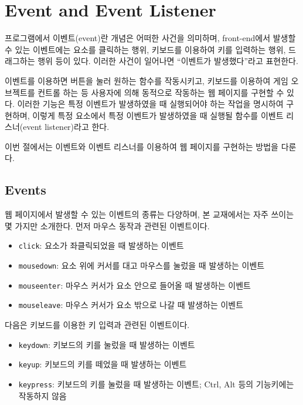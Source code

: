 \section{Event and Event Listener}\label{sect:event-and-event-listener}

프로그램에서 이벤트(event)란 개념은 어떠한 사건을 의미하며, front-end에서 발생할 수 있는 이벤트에는 요소를 클릭하는 행위, 키보드를 이용하여 키를 입력하는 행위, 드래그하는 행위 등이 있다. 이러한 사건이 일어나면 ``이벤트가 발생했다''라고 표현한다.

이벤트를 이용하면 버튼을 눌러 원하는 함수를 작동시키고, 키보드를 이용하여 게임 오브젝트를 컨트롤 하는 등 사용자에 의해 동적으로 작동하는 웹 페이지를 구현할 수 있다. 이러한 기능은 특정 이벤트가 발생하였을 때 실행되어야 하는 작업을 명시하여 구현하며, 이렇게 특정 요소에서 특정 이벤트가 발생하였을 때 실행될 함수를 이벤트 리스너(event listener)라고 한다. 

이번 절에서는 이벤트와 이벤트 리스너를 이용하여 웹 페이지를 구현하는 방법을 다룬다.

\subsection*{Events}

웹 페이지에서 발생할 수 있는 이벤트의 종류는 다양하며, 본 교재에서는 자주 쓰이는 몇 가지만 소개한다. 먼저 마우스 동작과 관련된 이벤트이다.

\begin{itemize}
    \item \texttt{click}: 요소가 좌클릭되었을 때 발생하는 이벤트
    \item \texttt{mousedown}: 요소 위에 커서를 대고 마우스를 눌렀을 때 발생하는 이벤트
    \item \texttt{mouseenter}: 마우스 커서가 요소 안으로 들어올 때 발생하는 이벤트
    \item \texttt{mouseleave}: 마우스 커서가 요소 밖으로 나갈 때 발생하는 이벤트
\end{itemize}

다음은 키보드를 이용한 키 입력과 관련된 이벤트이다.

\begin{itemize}
    \item \texttt{keydown}: 키보드의 키를 눌렀을 때 발생하는 이벤트
    \item \texttt{keyup}: 키보드의 키를 떼었을 때 발생하는 이벤트
    \item \texttt{keypress}: 키보드의 키를 눌렀을 때 발생하는 이벤트; Ctrl, Alt 등의 기능키에는 작동하지 않음
\end{itemize}

